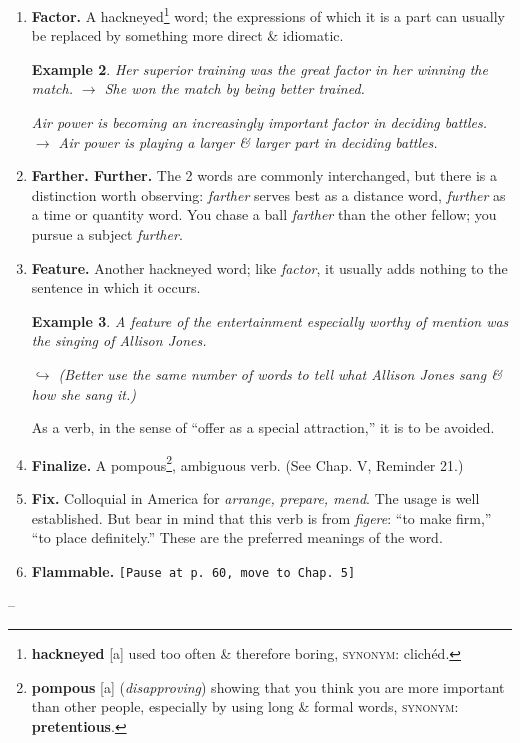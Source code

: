 \documentclass[oneside]{book}
\numberwithin{equation}{section}
\newtheorem{example}{Example}[chapter]
\begin{document}
\begin{enumerate}
	\begin{example}
		Parents complained bitterly about the fire hazard in the wooden facility.
		
		$\hookrightarrow$ Parents complained bitterly about the fire hazard in the wooden schoolhouse.
		
		He has been appointed warden of the new facility. $\to$ He has been appointed warden of the new prison.
	\end{example}
	\item \textbf{Factor.} A hackneyed\footnote{\textbf{hackneyed} [a] used too often \& therefore boring, \textsc{synonym}: clich\'ed.} word; the expressions of which it is a part can usually be replaced by something more direct \& idiomatic.
	
	\begin{example}
		Her superior training was the great factor in her winning the match. $\to$ She won the match by being better trained.
		
		Air power is becoming an increasingly important factor in deciding battles. $\to$ Air power is playing a larger \& larger part in deciding battles.
	\end{example}
	\item \textbf{Farther. Further.} The 2 words are commonly interchanged, but there is a distinction worth observing: \textit{farther} serves best as a distance word, \textit{further} as a time or quantity word. You chase a ball \textit{farther} than the other fellow; you pursue a subject \textit{further}.
	\item \textbf{Feature.} Another hackneyed word; like \textit{factor}, it usually adds nothing to the sentence in which it occurs.
	
	\begin{example}
		A feature of the entertainment especially worthy of mention was the singing of Allison Jones.
		
		$\hookrightarrow$ (Better use the same number of words to tell what Allison Jones sang \& how she sang it.)
	\end{example}
	As a verb, in the sense of ``offer as a special attraction,'' it is to be avoided.
	\item \textbf{Finalize.} A pompous\footnote{\textbf{pompous} [a] (\textit{disapproving}) showing that you think you are more important than other people, especially by using long \& formal words, \textsc{synonym}: \textbf{pretentious}.}, ambiguous verb. (See Chap. V, Reminder 21.)
	\item \textbf{Fix.} Colloquial in America for \textit{arrange, prepare, mend}. The usage is well established. But bear in mind that this verb is from \textit{figere}: ``to make firm,'' ``to place definitely.'' These are the preferred meanings of the word.
	\item \textbf{Flammable.} \texttt{[Pause at p. 60, move to Chap. 5]}
\end{enumerate}
-- \cite[Chap. 4, pp. 54--73]{Strunk_White2019}
\end{document}

